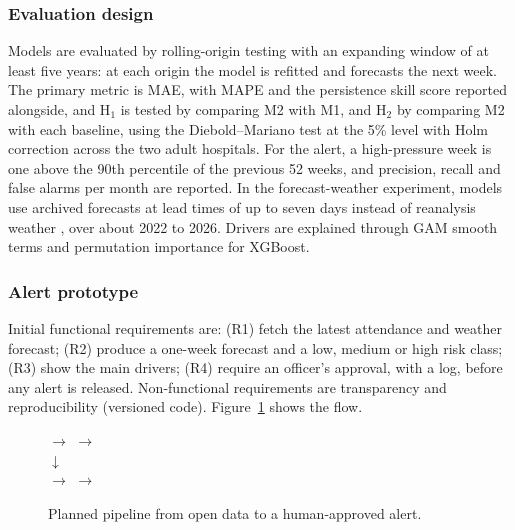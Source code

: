 \documentclass[12pt]{article}
\begin{document}
\subsubsection{Evaluation design}
Models are evaluated by rolling-origin testing with an expanding window of at least five years: at each origin the model is refitted and forecasts the next week. The primary metric is MAE, with MAPE and the persistence skill score reported alongside, and H$_1$ is tested by comparing M2 with M1, and H$_2$ by comparing M2 with each baseline, using the Diebold--Mariano test at the 5\% level \parencite{diebold1995} with Holm correction across the two adult hospitals. For the alert, a high-pressure week is one above the 90th percentile of the previous 52 weeks, and precision, recall and false alarms per month are reported. In the forecast-weather experiment, models use archived forecasts at lead times of up to seven days instead of reanalysis weather \parencite{openmeteo_hf}, over about 2022 to 2026. Drivers are explained through GAM smooth terms and permutation importance for XGBoost.

\subsubsection{Alert prototype}
Initial functional requirements are: (R1) fetch the latest attendance and weather forecast; (R2) produce a one-week forecast and a low, medium or high risk class; (R3) show the main drivers; (R4) require an officer's approval, with a log, before any alert is released. Non-functional requirements are transparency and reproducibility (versioned code). Figure~\ref{fig:pipeline} shows the flow.

\begin{figure}[h!]
\centering
\small
{} $\rightarrow$
 $\rightarrow$
\\[0.3cm]
$\downarrow$\\[0.1cm]
 $\rightarrow$
 $\rightarrow$
\caption{Planned pipeline from open data to a human-approved alert.}
\label{fig:pipeline}
\end{figure}
\end{document}
